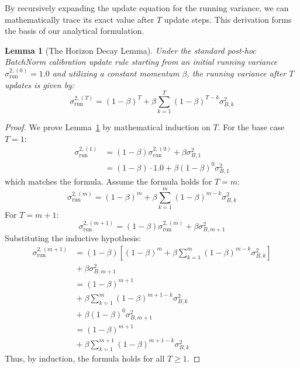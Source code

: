 \documentclass{article}
\newtheorem{lemma}[theorem]{Lemma}
\begin{document}
By recursively expanding the update equation for the running variance, we can mathematically trace its exact value after $T$ update steps. This derivation forms the basis of our analytical formulation.

\begin{lemma}[The Horizon Decay Lemma]
\label{lemma:decay}
Under the standard post-hoc BatchNorm calibration update rule starting from an initial running variance $\sigma^{2,(0)}_{\text{run}} = 1.0$ and utilizing a constant momentum $\beta$, the running variance after $T$ updates is given by:
\begin{equation}
  \sigma^{2,(T)}_{\text{run}} = (1 - \beta)^T + \beta \sum_{k=1}^T (1 - \beta)^{T-k} \sigma^2_{B,k}
\end{equation}
\end{lemma}

\begin{proof}
We prove Lemma~\ref{lemma:decay} by mathematical induction on $T$.
For the base case $T = 1$:
\begin{align}
  \sigma^{2,(1)}_{\text{run}} &= (1 - \beta)\sigma^{2,(0)}_{\text{run}} + \beta \sigma^2_{B,1} \nonumber \\
  &= (1 - \beta) \cdot 1.0 + \beta (1 - \beta)^0 \sigma^2_{B,1}
\end{align}
which matches the formula.
Assume the formula holds for $T = m$:
\begin{equation}
  \sigma^{2,(m)}_{\text{run}} = (1 - \beta)^m + \beta \sum_{k=1}^m (1 - \beta)^{m-k} \sigma^2_{B,k}
\end{equation}
For $T = m + 1$:
\begin{equation}
  \sigma^{2,(m+1)}_{\text{run}} = (1 - \beta) \sigma^{2,(m)}_{\text{run}} + \beta \sigma^2_{B,m+1}
\end{equation}
Substituting the inductive hypothesis:
\begin{align}
  \sigma^{2,(m+1)}_{\text{run}} &= (1\!-\!\beta) \left[ (1\!-\!\beta)^m + \beta \sum_{k=1}^m (1\!-\!\beta)^{m-k} \sigma^2_{B,k} \right] \nonumber \\
  &{} + \beta \sigma^2_{B,m+1} \\
  &= (1 - \beta)^{m+1} \nonumber \\
  &{} + \beta \sum_{k=1}^m (1\!-\!\beta)^{\!m\!+\!1\!-k} \sigma^2_{B,k} \nonumber \\
  &{} + \beta (1-\beta)^0 \sigma^2_{B,m+1} \\
  &= (1 - \beta)^{m+1} \nonumber \\
  &{} + \beta \sum_{k=1}^{m+1} (1\!-\!\beta)^{\!m\!+\!1\!-k} \sigma^2_{B,k}
\end{align}
Thus, by induction, the formula holds for all $T \geq 1$.
\end{proof}
\end{document}

